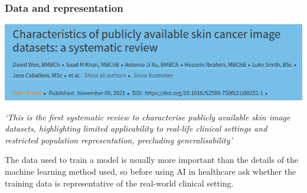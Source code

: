 \begin{frame}
\frametitle{Data and representation}

   \begin{center}
   \includegraphics[width=1.0\textwidth]{./misc_images/skin-1}
   \end{center}
\vspace{1mm}
\textit{`This is the first systematic review to characterise publicly available skin image datasets, highlighting limited applicability to real-life clinical settings and restricted population representation, precluding generalisability'}
\vspace{2mm}

The data used to train a model is usually more important than the details of the machine learning method used, so before using AI in healthcare ask whether the training data is representative of the real-world clinical setting.
\end{frame}